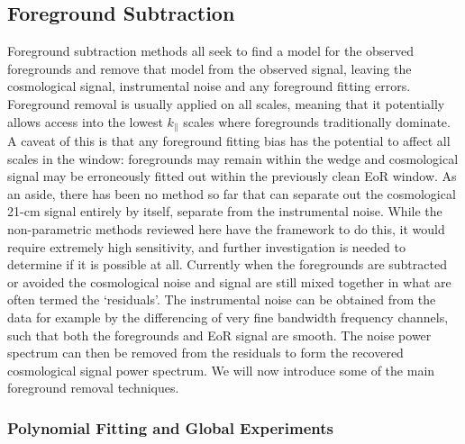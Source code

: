 \subsection{Foreground Subtraction}
Foreground subtraction methods all seek to find a model for the observed foregrounds and remove that model from the observed signal, leaving the cosmological signal, instrumental noise and any foreground fitting errors. Foreground removal is usually applied on all scales, meaning that it potentially allows access into the lowest $k_\parallel$ scales where foregrounds traditionally dominate. A caveat of this is that any foreground fitting bias has the potential to affect all scales in the window: foregrounds may remain within the wedge and cosmological signal may be erroneously fitted out within the previously clean EoR window. As an aside, there has been no method so far that can separate out the cosmological 21-cm signal entirely by itself, separate from the instrumental noise. While the non-parametric methods reviewed here have the framework to do this, it would require extremely high sensitivity, and further investigation is needed to determine if it is possible at all. Currently when the foregrounds are subtracted or avoided the cosmological noise and signal are still mixed together in what are often termed the `residuals'. The instrumental noise can be obtained from the data for example by the differencing of very fine bandwidth frequency channels, such that both the foregrounds and EoR signal are smooth. The noise power spectrum can then be removed from the residuals to form the recovered cosmological signal power spectrum. We will now introduce some of the main foreground removal techniques.

\subsubsection{Polynomial Fitting and Global Experiments}
\label{sec:poly}

